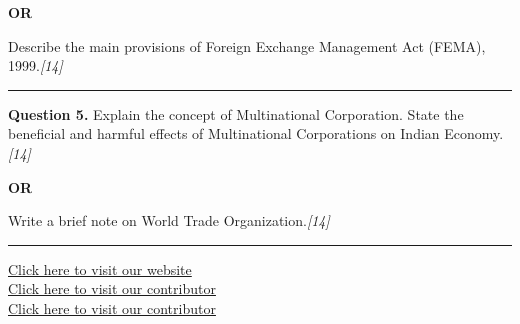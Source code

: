 \documentclass[11pt,a4paper]{article}
\newcommand{\pts}[1]{\hfill   \textit{[#1]}}
\begin{document}
\centerline{   \textbf{OR}}

Describe the main provisions of Foreign Exchange Management Act (FEMA), 1999.\pts{14}

\medskip\rule{\linewidth}{0.2pt}




\noindent   \textbf{Question 5.}
Explain the concept of Multinational Corporation. State the beneficial and harmful effects of Multinational Corporations on Indian Economy.\pts{14}

\centerline{   \textbf{OR}}

Write a brief note on World Trade Organization.\pts{14}

\vfill
\rule{\linewidth}{0.4pt}

\begin{center}\small
\href{https://bhu-exam.vercel.app/}{Click here to visit our website}\\[4pt]
\href{https://me-aryan.vercel.app/}{Click here to visit our contributor}\\[4pt]
\href{https://quashan-me.vercel.app/}{Click here to visit our contributor}
\end{center}
\end{document}
